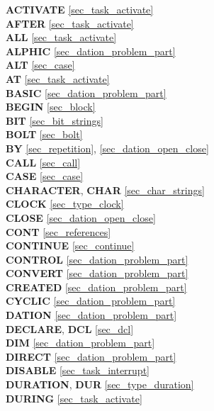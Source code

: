 

{
{\bf ACTIVATE} \ref{sec_task_activate}\\
{\bf AFTER} \ref{sec_task_activate}\\
{\bf ALL} \ref{sec_task_activate}\\
{\bf ALPHIC} \ref{sec_dation_problem_part}\\
{\bf ALT} \ref{sec_case}\\
{\bf AT} \ref{sec_task_activate}\\

{\bf BASIC} \ref{sec_dation_problem_part}\\
{\bf BEGIN} \ref{sec_block} \\
{\bf BIT} \ref{sec_bit_strings}\\
{\bf BOLT} \ref{sec_bolt}\\
{\bf BY} \ref{sec_repetition}, \ref{sec_dation_open_close}\\

{\bf CALL} \ref{sec_call}\\
{\bf CASE} \ref{sec_case}\\
{\bf CHARACTER}, {\bf CHAR} \ref{sec_char_strings}\\
{\bf CLOCK} \ref{sec_type_clock}\\
{\bf CLOSE} \ref{sec_dation_open_close}\\
{\bf CONT} \ref{sec_references}\\
{\bf CONTINUE} \ref{sec_continue}\\
{\bf CONTROL} \ref{sec_dation_problem_part}\\
{\bf CONVERT} \ref{sec_dation_problem_part}\\
{\bf CREATED} \ref{sec_dation_problem_part}\\
{\bf CYCLIC} \ref{sec_dation_problem_part}\\
 
{\bf DATION} \ref{sec_dation_problem_part}\\
{\bf DECLARE}, {\bf DCL} \ref{sec_dcl}\\
{\bf DIM} \ref{sec_dation_problem_part}\\
{\bf DIRECT} \ref{sec_dation_problem_part}\\
{\bf DISABLE} \ref{sec_task_interrupt}\\
{\bf DURATION}, {\bf DUR} \ref{sec_type_duration}\\
{\bf DURING} \ref{sec_task_activate}\\

}
